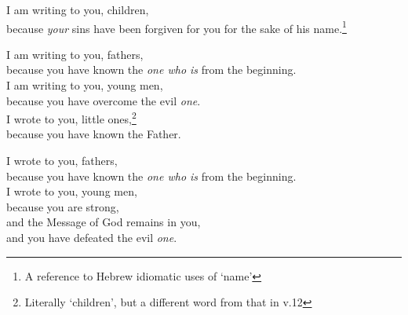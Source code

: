 \documentclass[article]{memoir}%
\newcounter{vnum}
\newcommand{\vnum}{%
	\textsuperscript{\thevnum}%
	\addtocounter{vnum}{1}%
}
\newcommand{\infer}[1]{\textit{#1}}
\begin{document}
\indent \vnum I am writing to you, children,\\
\indent \indent because \infer{your} sins have been forgiven for you for the sake of his name.\footnote{A reference to Hebrew idiomatic uses of `name'} \\
\indent \vnum I am writing to you, fathers,\\
\indent \indent because you have known the \infer{one who is} from the beginning.\\
\indent I am writing to you, young men,\\
\indent \indent because you have overcome the evil \infer{one}.\\
\indent I wrote to you, little ones,\footnote{Literally `children', but a different word from that in v.12}\\
\indent \indent because you have known the Father.\\
\indent \vnum I wrote to you, fathers,\\
\indent \indent because you have known the \infer{one who is} from the beginning.\\
\indent I wrote to you, young men,\\
\indent \indent because you are strong,\\
\indent \indent \indent and the Message of God remains in you,\\
\indent \indent \indent and you have defeated the evil \infer{one}.
\end{document}

